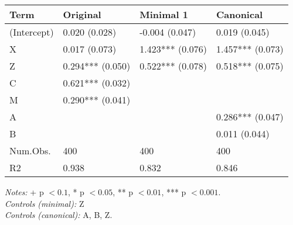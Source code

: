 \begin{center}
\begin{longtable}{@{}p{\dimexpr(\textwidth - 6\tabcolsep)/4\relax}p{\dimexpr(\textwidth - 6\tabcolsep)/4\relax}p{\dimexpr(\textwidth - 6\tabcolsep)/4\relax}p{\dimexpr(\textwidth - 6\tabcolsep)/4\relax}@{}}
\toprule
Term & Original & Minimal 1 & Canonical \\
\midrule
\textnormal{(Intercept)} & 0.020 (0.028) & -0.004 (0.047) & 0.019 (0.045) \\
\textnormal{X} & 0.017 (0.073) & 1.423*** (0.076) & 1.457*** (0.073) \\
\textnormal{Z} & 0.294*** (0.050) & 0.522*** (0.078) & 0.518*** (0.075) \\
\textnormal{C} & 0.621*** (0.032) &  &  \\
\textnormal{M} & 0.290*** (0.041) &  &  \\
\textnormal{A} &  &  & 0.286*** (0.047) \\
\textnormal{B} &  &  & 0.011 (0.044) \\
\textnormal{Num.Obs.} & 400 & 400 & 400 \\
\textnormal{R2} & 0.938 & 0.832 & 0.846 \\
\bottomrule
\end{longtable}
\endgroup
\end{center}
{\footnotesize \emph{Notes:} + p $< 0.1$, * p $< 0.05$, ** p $< 0.01$, *** p $< 0.001$.\\
\hspace*{1.5em}\textit{Controls (minimal):} {Z}\\
\hspace*{1.5em}\textit{Controls (canonical):} {A, B, Z}.}
\endgroup
